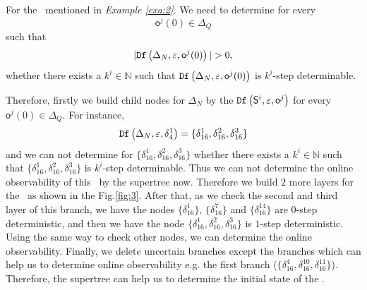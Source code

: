 \begin{example}
For the \BCN\ mentioned in {\em Example \ref{exa:2}}. We need to determine for every \[\mathsf{o}^{j}(0)\in \Delta_Q\] such that \[|\Ded\left(\Delta_N,\varepsilon, \mathsf{o}^{j}(0)\right)|> 0,\] whether there exists a $k^{i}\in \mathbb{N}$ such that ${\tt Df}\left(\Delta_N,\varepsilon,\mathsf{o}^{j}(0)\right)$ is $k^{i}$-step determinable.

Therefore, firstly we build child nodes for $\Delta_N$ by the ${\tt Df}\left(\mathsf{S}^i,\varepsilon, \mathsf{o}^j\right)$ for every $\mathsf{o}^{j}(0)\in \Delta_Q$. For instance, \[{\tt Df}\left(\Delta_N,\varepsilon,\delta_{4}^1\right)=\{\delta_{16}^1,\delta_{16}^2,\delta_{16}^3\}\] and we can not determine for $\{\delta_{16}^1,\delta_{16}^2,\delta_{16}^3\}$ whether there exists a $k^{i}\in \mathbb{N}$ such that $\{\delta_{16}^1,\delta_{16}^2,\delta_{16}^3\}$ is $k^{i}$-step determinable. Thus we can not determine the online observability of this \BCN\ by the supertree now. Therefore we build $2$ more layers for the \BCN\ as shown in the Fig.\ref{fig:3}. After that, as we check the second and third layer of this branch, we have the nodes $\{\delta_{16}^1\}$, $\{\delta_{16}^7\}$ and $\{\delta_{16}^{14}\}$ are $0$-step deterministic, and then we have the node $\{\delta_{16}^1,\delta_{16}^2,\delta_{16}^3\}$ is $1$-step deterministic. Using the same way to check other nodes, we can determine the online observability. Finally, we delete uncertain branches except the branches which can help us to determine online observability e.g. the first branch ($\{\delta_{16}^{4},\delta_{16}^{10},\delta_{16}^{11}\}$). Therefore, the supertree can help us to determine the initial state of the \BCN.%
\label{exa:11}
\end{example}   

